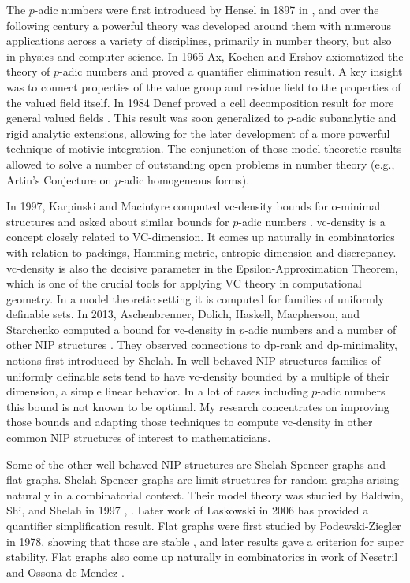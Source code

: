 The $p$-adic numbers were first introduced by Hensel in 1897 in \cite{hensel}, and over the following century a powerful theory was developed around them with numerous applications across a variety of disciplines, primarily in number theory, but also in physics and computer science.
In 1965 Ax, Kochen \cite{ak1} and Ershov \cite{er1} axiomatized the theory of $p$-adic numbers and proved a quantifier elimination result.
A key insight was to connect properties of the value group and residue field to the properties of the valued field itself.
In 1984 Denef proved a cell decomposition result for more general valued fields \cite{den84}.
This result was soon generalized to $p$-adic subanalytic and rigid analytic extensions, allowing for the later development of a more powerful technique of motivic integration.
The conjunction of those model theoretic results allowed to solve a number of outstanding open problems in number theory (e.g., Artin's Conjecture on $p$-adic homogeneous forms).

In 1997, Karpinski and Macintyre computed vc-density bounds for o-minimal structures and asked about similar bounds for $p$-adic numbers \cite{karp97}.
vc-density is a concept closely related to VC-dimension.
It comes up naturally in combinatorics with relation to packings, Hamming metric, entropic dimension and discrepancy.
 vc-density is also the decisive parameter in the Epsilon-Approximation Theorem, which is one of the crucial tools for applying VC theory in computational geometry.
In a model theoretic setting it is computed for families of uniformly definable sets.
 In 2013, Aschenbrenner, Dolich, Haskell, Macpherson, and Starchenko computed a bound for vc-density in $p$-adic numbers and a number of other NIP structures \cite{density}.
They observed connections to dp-rank and dp-minimality, notions first introduced by Shelah.
In well behaved NIP structures families of uniformly definable sets tend to have vc-density bounded by a multiple of their dimension, a simple linear behavior.
In a lot of cases including $p$-adic numbers this bound is not known to be optimal.
My research concentrates on improving those bounds and adapting those techniques to compute vc-density in other common NIP structures of interest to mathematicians.

Some of the other well behaved NIP structures are Shelah-Spencer graphs and flat graphs.
Shelah-Spencer graphs are limit structures for random graphs arising naturally in a combinatorial context.
Their model theory was studied by Baldwin, Shi, and Shelah in 1997 \cite{shi}, \cite{baldwin}.
Later work of Laskowski in 2006 \cite{laskowski} has provided a quantifier simplification result.
 Flat graphs were first studied by Podewski-Ziegler in 1978, showing that those are stable \cite{stable_graphs}, and later results gave a criterion for super stability.
Flat graphs also come up naturally in combinatorics in work of Nesetril and Ossona de Mendez \cite{nowhere}.


